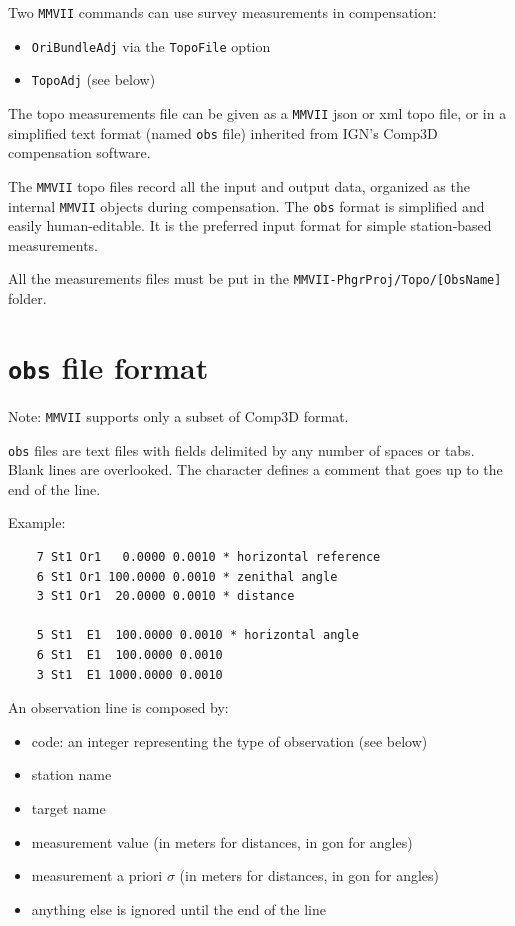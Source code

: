 Two {\tt MMVII} commands can use survey measurements in compensation:
\begin{itemize}
    \item {\tt OriBundleAdj} via the {\tt TopoFile} option
    \item {\tt TopoAdj} (see below)
\end{itemize}

The topo measurements file can be given as a {\tt MMVII} json or xml topo file, or in a simplified text format (named {\tt obs} file) inherited from IGN's Comp3D compensation software.

The {\tt MMVII} topo files record all the input and output data, organized as the internal {\tt MMVII} objects during compensation.
The {\tt obs} format is simplified and easily human-editable. It is the preferred input format for simple station-based measurements.

All the measurements files must be put in the {\tt MMVII-PhgrProj/Topo/[ObsName]} folder.

\section{{\tt obs} file format}
\label{sec:compObsFormat}
Note: {\tt MMVII} supports only a subset of Comp3D format.

{\tt obs} files are text files with fields delimited by any number of spaces or tabs. Blank lines are overlooked.
The {\tt *} character defines a comment that goes up to the end of the line.

Example:

\begin{verbatim}
    7 St1 Or1   0.0000 0.0010 * horizontal reference
    6 St1 Or1 100.0000 0.0010 * zenithal angle
    3 St1 Or1  20.0000 0.0010 * distance

    5 St1  E1  100.0000 0.0010 * horizontal angle
    6 St1  E1  100.0000 0.0010
    3 St1  E1 1000.0000 0.0010
\end{verbatim}

An observation line is composed by:

\begin{itemize}
    \item code: an integer representing the type of observation (see below)
    \item station name
    \item target name
    \item measurement value (in meters for distances, in gon for angles)
    \item measurement a priori $\sigma$ (in meters for distances, in gon for angles)
    \item anything else is ignored until the end of the line
\end{itemize}

